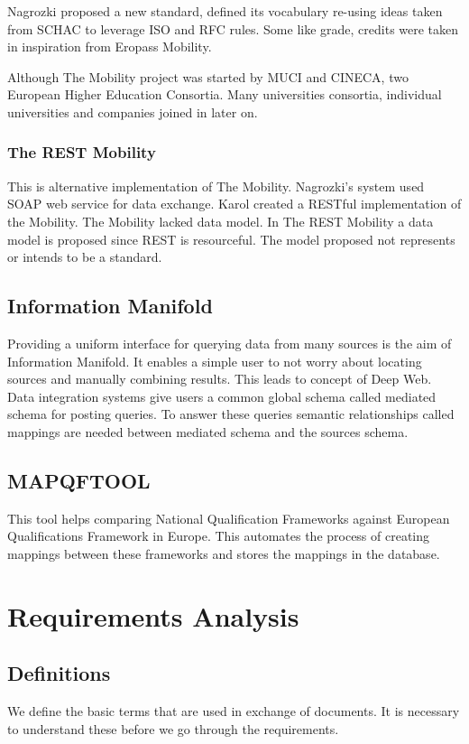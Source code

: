 \documentclass[12pt,a4paper,oneside]{book}
\begin{document}
    Nagrozki proposed a new standard, defined its vocabulary re-using ideas taken from SCHAC to leverage ISO and RFC rules. Some like grade, credits were taken in inspiration from Eropass Mobility.

    Although The Mobility project was started by MUCI and CINECA, two European Higher Education Consortia. Many universities consortia, individual universities and companies joined in later on.

    \subsection{The REST Mobility}
    This is alternative implementation of The Mobility. Nagrozki's system used SOAP web service for data exchange. Karol created a RESTful implementation of the Mobility. The Mobility lacked data model. In The REST Mobility a data model is proposed since REST is resourceful. The model proposed not represents or intends to be a standard.

\section{Information Manifold}
Providing a uniform interface for querying data from many sources is the aim of Information Manifold. It enables a simple user to not worry about locating sources and manually combining results. This leads to concept of Deep Web. Data integration systems give users a common global schema called mediated schema for posting queries. To answer these queries semantic relationships called mappings are needed between mediated schema and the sources schema.

\section{MAPQFTOOL}
This tool helps comparing National Qualification Frameworks against European Qualifications Framework in Europe. This automates the process of creating mappings between these frameworks and stores the mappings in the database.

\chapter{Requirements Analysis}\label{ch-requirements-analysis}
\section{Definitions}
We define the basic terms that are used in exchange of documents. It is necessary to understand these before we go through the requirements.
\end{document}
